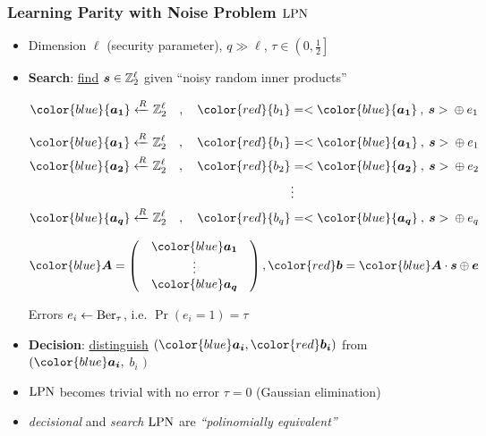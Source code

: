 \begin{frame}
\frametitle{Learning Parity with Noise Problem $\mathrm{LPN}$}
\begin{itemize}
 \item Dimension $\ell$ (security parameter), $q \gg \ell$, $\tau \in \left( 0,\frac{1}{2} \right]$
 \item \textbf{Search}: \underline{find}  $ \boldsymbol{s} \in \mathbb{Z}_2^{\ell}$ given ``noisy random inner products'' \\
 \begin{overprint}
 \begin{align*}
  {\color{blue}{\vect{a_1}}} \R \zol \quad , \quad {\color{red}{b_1}} &= <{\color{blue}{\vect{a_1}}} \: , \: \vect{s}> \: \xor \: e_1 \\  
  \end{align*}

  \begin{align*}
  {\color{blue}{\vect{a_1}}} \R \zol \quad , \quad {\color{red}{b_1}} &= <{\color{blue}{\vect{a_1}}} \: , \: \vect{s}> \: \xor \: e_1 \\
  {\color{blue}{\vect{a_2}}} \R \zol \quad, \quad  {\color{red}{b_2}} &= <{\color{blue}{\vect{a_2}}} \: , \: \vect{s}> \: \xor \: e_2 \\
   & \vdots \\
   {\color{blue}{\vect{a_q}}} \R \zol \quad, \quad  {\color{red}{b_q}} &= <{\color{blue}{\vect{a_q}}} \: , \: \vect{s}> \: \xor \: e_q \\
  \end{align*}

  \vspace*{25pt}
\[
{\color{blue} \vect{A}} = \begin{pmatrix}
            & {\color{blue}\vect{a_1}} & \\
            & \vdots  & \\ 
            & {\color{blue}\vect{a_q}} & 
           \end{pmatrix}  , {\color{red} \vect{b}} = {\color{blue} \vect{A}} \cdot \vect{s} \xor \vect{e} 
\]
 \end{overprint}
  Errors $e_i \gets \mathrm{Ber}_{\tau}$, i.e. $\Pr(e_i=1)= \tau$
 \item \textbf{Decision}: \underline{distinguish} $\left( {\color{blue}\vect{a_i}}, {\color{red}\vect{b_i}} \right)$ from {\color{blue}{uniform}} $( {\color{blue}\vect{a_i}}, $ {\color{blue} $b_i$} $)$
 \item $\mathrm{LPN}$ becomes trivial with no error $\tau=0$ (Gaussian elimination)
 \item \emph{decisional} and \emph{search} $\mathrm{LPN}$ are \emph{``polinomially equivalent''} \\ 
 \end{itemize}
\end{frame}

